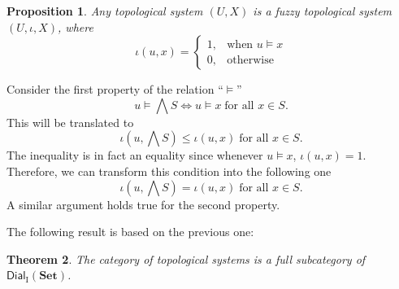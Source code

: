 \documentclass[11pt]{article}
\newtheorem{theorem}{Theorem}[section]
\newtheorem{proposition}[theorem]{Proposition}
\newenvironment{proof}[1][Proof]{\begin{trivlist}
\item[\hskip \labelsep {\bfseries #1}]}{\end{trivlist}}
\begin{document}
\begin{proposition}
Any topological system $(U,X)$ is a fuzzy topological system $(U,\iota,X)$, where
\begin{displaymath}
\iota(u,x)=\left\{\begin{array}{ll}
                   1, & \text{when $u\models x$}\\
                   0, & \text{otherwise}
                  \end{array}\right.
\end{displaymath}
\end{proposition}
\begin{proof}
Consider the first property of the relation ``$\models$''
\begin{displaymath}
u\models \bigwedge S \Longleftrightarrow u\models x\;\text{for all $x\in S$}.
\end{displaymath}
This will be translated to 
\begin{displaymath}
\iota(u,\bigwedge S)\le \iota(u, x)\;\text{for all $x\in S$}.
\end{displaymath}
The inequality is in fact an equality since whenever $u\models x$, $\iota(u,x)=1$. Therefore,
we can transform this condition into the following one
\begin{displaymath}
\iota(u,\bigwedge S) = \iota(u, x)\;\text{for all $x\in S$}.
\end{displaymath}
A similar argument holds true for the second property.
\end{proof}
The following result is based on the previous one: 
\begin{theorem}
The category of topological systems is a full subcategory of 
$\mathsf{Dial}_{\mathrm{I}}(\mathbf{Set})$.
\end{theorem}
\end{document}
